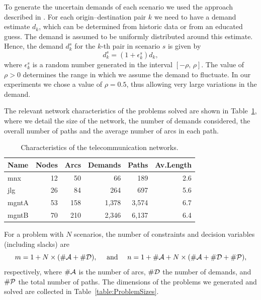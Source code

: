 To generate the uncertain demands of each scenario 
we used the approach described in \cite{Ouorou}. 
For each origin--destination pair $k$ we need to have a demand 
estimate $d_k$, which can be determined from historic data 
or from an educated guess. The demand is assumed to be uniformly 
distributed around this estimate. Hence, the demand $d_k^s$ 
for the $k$-th pair in scenario $s$ is given by
\[
d_k^s = (1+ \epsilon_k^s)d_k,
\]
where $\epsilon_k^s$ is a random number generated in the interval 
$[-\rho, \, \rho]$. The value of $\rho > 0$ determines the range 
in which we assume the demand to fluctuate.
In our experiments we chose a value of $\rho = 0.5$, thus allowing
very large variations in the demand.
%

The relevant network characteristics of the problems solved are shown 
in Table~\ref{table:ProblemData}, where we detail the size of the network, 
the number of demands considered, the overall number of paths and the
average number of arcs in each path.
%
%
%
\begin{table}[ht]
  \begin{center}
    \begin{tabular}{|l||r|r|r|r|r|} \hline
      Name      & Nodes & Arcs & Demands & Paths & Av.Length \\ \hline\hline
      mnx       &    12 &   50 &     66  &   189 & 2.6 \\
      jlg       &    26 &   84 &    264  &   697 & 5.6 \\
      mgntA     &    53 &  158 &  1,378  & 3,574 & 6.7 \\
      mgntB     &    70 &  210 &  2,346  & 6,137 & 6.4 \\ \hline
    \end{tabular}
    \caption{Characteristics of the telecommunication networks.}
    \label{table:ProblemData}
  \end{center} \vspace{-3ex}
\end{table}

For a problem with $N$ scenarios, the number of constraints and 
decision variables (including slacks) are
\[
m = 1 + N \times (\#{\cal A} + \#{\cal D}), \quad \mbox{ and } \quad
n = 1 + \#{\cal A} + N \times (\#{\cal A} + \#{\cal D} + \#{\cal P}),
\]
respectively, where $\#{\cal A}$ is the number of arcs, $\#{\cal D}$ 
the number of demands, and $\#{\cal P}$ the total number of paths.
The dimensions of the problems we generated and solved are
collected in Table~\ref{table:ProblemSizes}.

